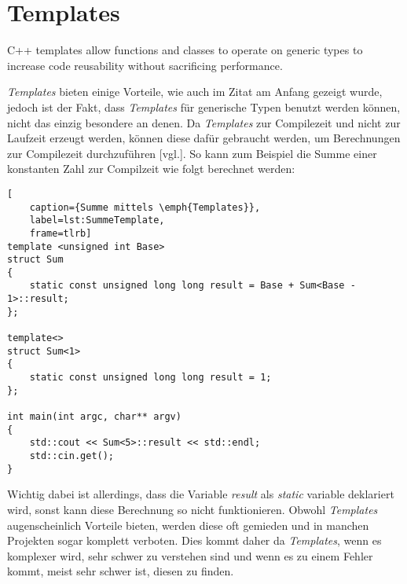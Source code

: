 \section{Templates}\label{sec:templates}
\begin{zitat}
    C++ templates allow functions and classes to operate on generic types to increase code
    reusability without sacrificing performance. \cite{TemplatesVorteil}
\end{zitat}
\emph{Templates} bieten einige Vorteile, wie auch im Zitat am Anfang gezeigt wurde, jedoch ist der
Fakt, dass \emph{Templates} für generische Typen benutzt werden können, nicht das einzig
besondere an denen.
\newline
\newline
Da \emph{Templates} zur Compilezeit und nicht zur Laufzeit erzeugt werden, können diese dafür
gebraucht werden, um Berechnungen zur Compilezeit durchzuführen \cite{HandsOn}[vgl.]. So kann zum
Beispiel die Summe einer konstanten Zahl zur Compilzeit wie folgt berechnet werden:
\begin{lstlisting}[
    caption={Summe mittels \emph{Templates}},
    label=lst:SummeTemplate,
    frame=tlrb]
template <unsigned int Base>
struct Sum
{
	static const unsigned long long result = Base + Sum<Base - 1>::result;
};

template<>
struct Sum<1>
{
	static const unsigned long long result = 1;
};

int main(int argc, char** argv)
{
	std::cout << Sum<5>::result << std::endl;
	std::cin.get();
}
\end{lstlisting}

Wichtig dabei ist allerdings, dass die Variable \emph{result} als \emph{static} variable
deklariert wird, sonst kann diese Berechnung so nicht funktionieren.
\newline
\newline
Obwohl \emph{Templates} augenscheinlich Vorteile bieten, werden diese oft gemieden und in manchen
Projekten sogar komplett verboten. Dies kommt daher da \emph{Templates}, wenn es komplexer wird,
sehr schwer zu verstehen sind und wenn es zu einem Fehler kommt, meist sehr schwer ist, diesen zu
finden.